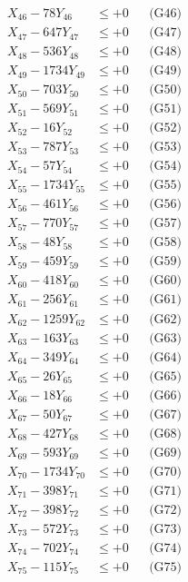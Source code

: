 \documentclass[a4paper,10pt]{article}
\begin{document}
{\begin{align}
X_{46} - 78Y_{46} &\leq +0 && \text{(G46)} \\
X_{47} - 647Y_{47} &\leq +0 && \text{(G47)} \\
X_{48} - 536Y_{48} &\leq +0 && \text{(G48)} \\
X_{49} - 1734Y_{49} &\leq +0 && \text{(G49)} \\
X_{50} - 703Y_{50} &\leq +0 && \text{(G50)} \\
\allowbreak
X_{51} - 569Y_{51} &\leq +0 && \text{(G51)} \\
X_{52} - 16Y_{52} &\leq +0 && \text{(G52)} \\
X_{53} - 787Y_{53} &\leq +0 && \text{(G53)} \\
X_{54} - 57Y_{54} &\leq +0 && \text{(G54)} \\
X_{55} - 1734Y_{55} &\leq +0 && \text{(G55)} \\
X_{56} - 461Y_{56} &\leq +0 && \text{(G56)} \\
X_{57} - 770Y_{57} &\leq +0 && \text{(G57)} \\
X_{58} - 48Y_{58} &\leq +0 && \text{(G58)} \\
X_{59} - 459Y_{59} &\leq +0 && \text{(G59)} \\
X_{60} - 418Y_{60} &\leq +0 && \text{(G60)} \\
\allowbreak
X_{61} - 256Y_{61} &\leq +0 && \text{(G61)} \\
X_{62} - 1259Y_{62} &\leq +0 && \text{(G62)} \\
X_{63} - 163Y_{63} &\leq +0 && \text{(G63)} \\
X_{64} - 349Y_{64} &\leq +0 && \text{(G64)} \\
X_{65} - 26Y_{65} &\leq +0 && \text{(G65)} \\
X_{66} - 18Y_{66} &\leq +0 && \text{(G66)} \\
X_{67} - 50Y_{67} &\leq +0 && \text{(G67)} \\
X_{68} - 427Y_{68} &\leq +0 && \text{(G68)} \\
X_{69} - 593Y_{69} &\leq +0 && \text{(G69)} \\
X_{70} - 1734Y_{70} &\leq +0 && \text{(G70)} \\
\allowbreak
X_{71} - 398Y_{71} &\leq +0 && \text{(G71)} \\
X_{72} - 398Y_{72} &\leq +0 && \text{(G72)} \\
X_{73} - 572Y_{73} &\leq +0 && \text{(G73)} \\
X_{74} - 702Y_{74} &\leq +0 && \text{(G74)} \\
X_{75} - 115Y_{75} &\leq +0 && \text{(G75)} \\

\end{align}}
\end{document}
